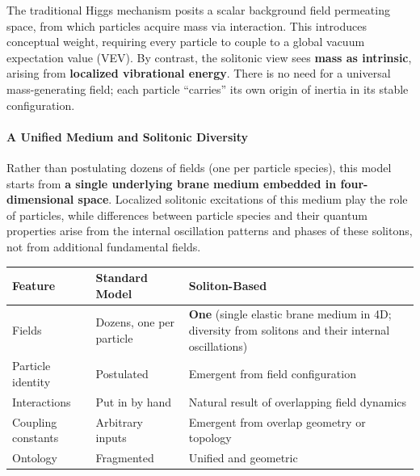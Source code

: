 The traditional Higgs mechanism posits a scalar background field
permeating space, from which particles acquire mass via interaction.
This introduces conceptual weight, requiring every particle to couple to
a global vacuum expectation value (VEV). By contrast, the solitonic view
sees \textbf{mass as intrinsic}, arising from \textbf{localized
vibrational energy}. There is no need for a universal mass-generating
field; each particle ``carries'' its own origin of inertia in its stable
configuration.

\paragraph{A Unified Medium and Solitonic
Diversity}\label{a-unified-medium-and-solitonic-diversity}

Rather than postulating dozens of fields (one per particle species),
this model starts from \textbf{a single underlying brane medium
embedded in four-dimensional space}. Localized solitonic excitations of
this medium play the role of particles, while differences between
particle species and their quantum properties arise from the internal
oscillation patterns and phases of these solitons, not from additional
fundamental fields.

\begin{longtable}[]{@{}
  >{\raggedright\arraybackslash}p{}
  >{\raggedright\arraybackslash}p{}
  >{\raggedright\arraybackslash}p{}@{}}
\toprule\noalign{}
\begin{minipage}[b]{\linewidth}\raggedright
Feature
\end{minipage} & \begin{minipage}[b]{\linewidth}\raggedright
Standard Model
\end{minipage} & \begin{minipage}[b]{\linewidth}\raggedright
Soliton-Based
\end{minipage} \\
\midrule\noalign{}
\endhead
\bottomrule\noalign{}
\endlastfoot
Fields & Dozens, one per particle & \textbf{One} (single elastic brane medium in 4D; diversity from solitons and their internal oscillations) \\
Particle identity & Postulated & Emergent from field configuration \\
Interactions & Put in by hand & Natural result of overlapping field
dynamics \\
Coupling constants & Arbitrary inputs & Emergent from overlap geometry
or topology \\
Ontology & Fragmented & Unified and geometric \\
\end{longtable}

